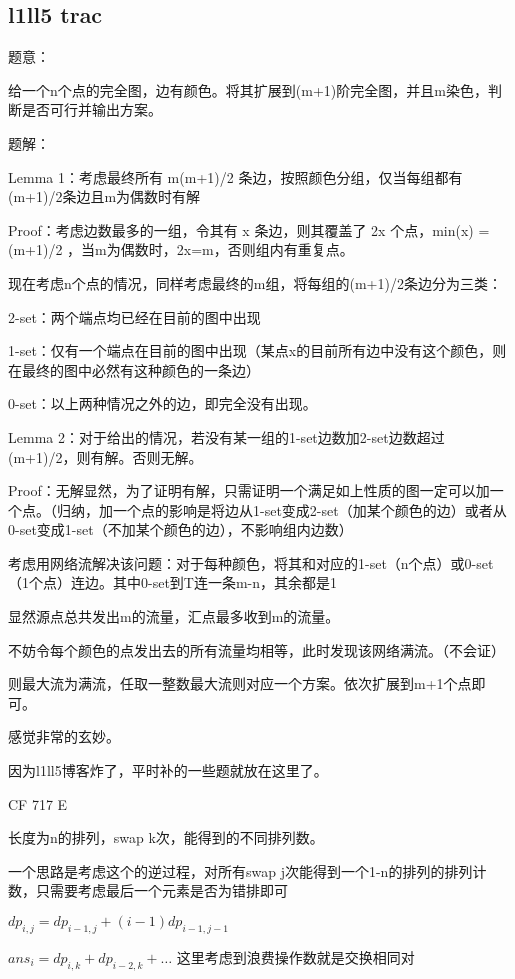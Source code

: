 \documentclass[12pt]{ctexart}
\begin{document}
\subsection{l1ll5 trac}

题意：

给一个n个点的完全图，边有颜色。将其扩展到(m+1)阶完全图，并且m染色，判断是否可行并输出方案。

题解：

Lemma 1：考虑最终所有 m(m+1)/2 条边，按照颜色分组，仅当每组都有(m+1)/2条边且m为偶数时有解

Proof：考虑边数最多的一组，令其有 x 条边，则其覆盖了 2x 个点，min(x) = (m+1)/2 ，当m为偶数时，2x=m，否则组内有重复点。

现在考虑n个点的情况，同样考虑最终的m组，将每组的(m+1)/2条边分为三类：

2-set：两个端点均已经在目前的图中出现

1-set：仅有一个端点在目前的图中出现（某点x的目前所有边中没有这个颜色，则在最终的图中必然有这种颜色的一条边）

0-set：以上两种情况之外的边，即完全没有出现。

Lemma 2：对于给出的情况，若没有某一组的1-set边数加2-set边数超过(m+1)/2，则有解。否则无解。

Proof：无解显然，为了证明有解，只需证明一个满足如上性质的图一定可以加一个点。（归纳，加一个点的影响是将边从1-set变成2-set（加某个颜色的边）或者从0-set变成1-set（不加某个颜色的边），不影响组内边数）

考虑用网络流解决该问题：对于每种颜色，将其和对应的1-set（n个点）或0-set（1个点）连边。其中0-set到T连一条m-n，其余都是1

显然源点总共发出m的流量，汇点最多收到m的流量。

不妨令每个颜色的点发出去的所有流量均相等，此时发现该网络满流。（不会证）

则最大流为满流，任取一整数最大流则对应一个方案。依次扩展到m+1个点即可。

感觉非常的玄妙。

因为l1ll5博客炸了，平时补的一些题就放在这里了。

CF 717 E

长度为n的排列，swap k次，能得到的不同排列数。

一个思路是考虑这个的逆过程，对所有swap j次能得到一个1-n的排列的排列计数，只需要考虑最后一个元素是否为错排即可

$dp_{i,j}=dp_{i-1,j}+(i-1)dp_{i-1,j-1}$

$ans_i = dp_{i,k}+dp_{i-2,k} + \ldots$ 这里考虑到浪费操作数就是交换相同对
\end{document}
